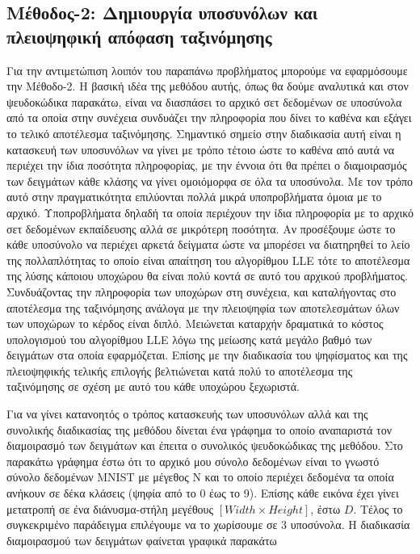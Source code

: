 \subsection{Μέθοδος-2: Δημιουργία υποσυνόλων και πλειοψηφική απόφαση ταξινόμησης }
\par
Για την αντιμετώπιση λοιπόν του παραπάνω προβλήματος μπορούμε να εφαρμόσουμε την Μέθοδο-2. Η βασική ιδέα της μεθόδου αυτής, όπως θα δούμε αναλυτικά και στον ψευδοκώδικα παρακάτω, είναι να διασπάσει το αρχικό σετ δεδομένων σε υποσύνολα από τα οποία στην συνέχεια συνδυάζει την πληροφορία που δίνει το καθένα και εξάγει το τελικό αποτέλεσμα ταξινόμησης. Σημαντικό σημείο στην διαδικασία αυτή είναι η κατασκευή των υποσυνόλων να γίνει με τρόπο τέτοιο ώστε το καθένα από αυτά να περιέχει την ίδια ποσότητα πληροφορίας, με την έννοια ότι θα πρέπει ο διαμοιρασμός των δειγμάτων κάθε κλάσης να γίνει ομοιόμορφα σε όλα τα υποσύνολα. Με τον τρόπο αυτό στην πραγματικότητα επιλύονται πολλά μικρά υποπροβλήματα όμοια με το αρχικό. Υποπροβλήματα δηλαδή τα οποία περιέχουν την ίδια πληροφορία με το αρχικό σετ δεδομένων εκπαίδευσης αλλά σε μικρότερη ποσότητα. Αν προσέξουμε ώστε το κάθε υποσύνολο να περιέχει αρκετά δείγματα ώστε να μπορέσει να διατηρηθεί το λείο της πολλαπλότητας το οποίο είναι απαίτηση του αλγορίθμου \textlatin{LLE} τότε το αποτέλεσμα της λύσης κάποιου υποχώρου θα είναι πολύ κοντά σε αυτό του αρχικού προβλήματος. Συνδυάζοντας την πληροφορία των υποχώρων στη συνέχεια, και καταλήγοντας στο αποτέλεσμα της ταξινόμησης ανάλογα με την πλειοψηφία των αποτελεσμάτων όλων των υποχώρων το κέρδος είναι διπλό. Μειώνεται καταρχήν δραματικά το κόστος υπολογισμού του αλγορίθμου \textlatin{LLE} λόγω της μείωσης κατά μεγάλο βαθμό των δειγμάτων στα οποία εφαρμόζεται. Επίσης με την διαδικασία του ψηφίσματος και της πλειοψηφικής τελικής επιλογής βελτιώνεται κατά πολύ το αποτέλεσμα της ταξινόμησης σε σχέση με αυτό του κάθε υποχώρου ξεχωριστά. 
\par
Για να γίνει κατανοητός ο τρόπος κατασκευής των υποσυνόλων αλλά και της συνολικής διαδικασίας της μεθόδου δίνεται ένα γράφημα το οποίο αναπαριστά τον διαμοιρασμό των δειγμάτων και έπειτα ο συνολικός ψευδοκώδικας της μεθόδου. Στο παρακάτω γράφημα έστω ότι το αρχικό μου σύνολο δεδομένων είναι το γνωστό σύνολο δεδομένων \textlatin{MNIST}\textlatin{\cite{mnist}} με μέγεθος \textlatin{N} και το οποίο περιέχει δεδομένα τα οποία ανήκουν σε δέκα κλάσεις (ψηφία από το 0 έως το 9). Επίσης κάθε εικόνα έχει γίνει μετατροπή σε ένα διάνυσμα-στήλη μεγέθους $[Width \times Height]$, έστω $D$. Τέλος το συγκεκριμένο παράδειγμα επιλέγουμε να το χωρίσουμε σε 3 υποσύνολα. Η διαδικασία διαμοιρασμού των δειγμάτων φαίνεται γραφικά παρακάτω
